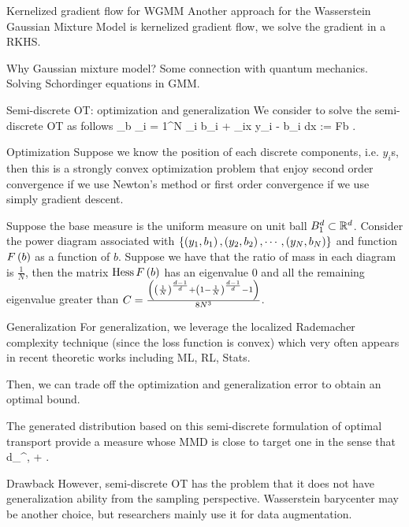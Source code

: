 \documentclass{beamer}
\begin{document}
\begin{frame}{Kernelized gradient flow for WGMM}
	Another approach for the Wasserstein Gaussian Mixture Model is kernelized gradient flow, we solve the gradient in a RKHS.
	\par
	Why Gaussian mixture model? Some connection with quantum mechanics. Solving Schordinger equations in GMM.
\end{frame}


\begin{frame}{Semi-discrete OT: optimization and generalization}
	We consider to solve the semi-discrete OT as follows
	\bequ\label{semi-dual}
	\inf_{b} \sum_{i = 1}^N \nu_i b_i + \int \max_{i}\lbb x \cdot y_i - b_i \rbb d\rho\lp x \rp := F\lp b \rp.
\eequ
\end{frame}


\begin{frame}{Optimization}
	Suppose we know the position of each discrete components, i.e. $y_i$s, then this is a strongly convex optimization problem that enjoy second order convergence if we use Newton's method or first order convergence if we use simply gradient descent.
	\begin{Prop}\label{eigen-bound}
	Suppose the base measure is the uniform measure on unit ball $B_1^d \subset \mathbb{R}^d$. Consider the power diagram associated with $\left\{ \left( y_1, b_1 \right), \left( y_2, b_2 \right), \cdots, \left( y_N, b_N \right) \right\}$ and function $F\left( b \right)$ as a function of $b$. Suppose we have that the ratio of mass in each diagram is $\frac{1}{N}$, then the matrix $\operatorname{Hess} F\left( b \right)$ has an eigenvalue $0$ and all the remaining eigenvalue greater than $C = \frac{\left( \left( \frac{1}{N} \right)^{\frac{d - 1}{d}} + \left( 1 - \frac{1}{N} \right)^{\frac{d - 1}{d}} - 1 \right)}{8N^3}$.
\end{Prop}
\end{frame}


\begin{frame}{Generalization}
	For generalization, we leverage the localized Rademacher complexity technique (since the loss function is convex) which very often appears in recent theoretic works including ML, RL, Stats.
	\par
	Then, we can trade off the optimization and generalization error to obtain an optimal bound.
	\begin{Thm}
	The generated distribution based on this semi-discrete formulation of optimal transport provide a measure whose MMD is close to target one in the sense that
	\bequn
		d_{\mcH}^{}\lp {}, \nu \rp \leq {} + .
	\eequn
\end{Thm}
\end{frame}


\begin{frame}{Drawback}
	However, semi-discrete OT has the problem that it does not have generalization ability from the sampling perspective. Wasserstein barycenter may be another choice, but researchers mainly use it for data augmentation.
\end{frame}
\end{document}

